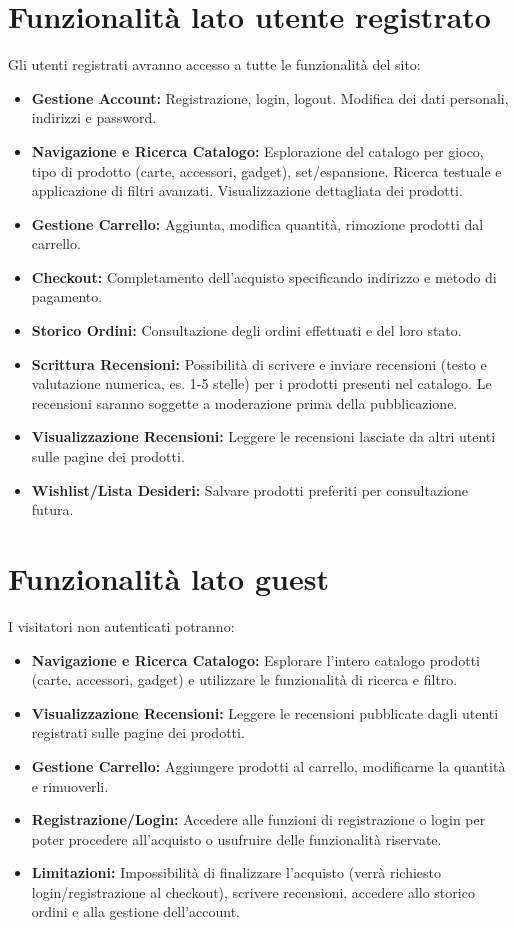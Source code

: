 \documentclass[14pt]{extreport}
\begin{document}
\section{Funzionalità lato utente registrato}
Gli utenti registrati avranno accesso a tutte le funzionalità del sito:
\begin{itemize}
    \item \textbf{Gestione Account:} Registrazione, login, logout. Modifica dei dati personali, indirizzi e password.
    \item \textbf{Navigazione e Ricerca Catalogo:} Esplorazione del catalogo per gioco, tipo di prodotto (carte, accessori, gadget), set/espansione. Ricerca testuale e applicazione di filtri avanzati. Visualizzazione dettagliata dei prodotti.
    \item \textbf{Gestione Carrello:} Aggiunta, modifica quantità, rimozione prodotti dal carrello.
    \item \textbf{Checkout:} Completamento dell'acquisto specificando indirizzo e metodo di pagamento.
    \item \textbf{Storico Ordini:} Consultazione degli ordini effettuati e del loro stato.
    \item \textbf{Scrittura Recensioni:} Possibilità di scrivere e inviare recensioni (testo e valutazione numerica, es. 1-5 stelle) per i prodotti presenti nel catalogo. Le recensioni saranno soggette a moderazione prima della pubblicazione.
    \item \textbf{Visualizzazione Recensioni:} Leggere le recensioni lasciate da altri utenti sulle pagine dei prodotti.
    \item \textbf{Wishlist/Lista Desideri:} Salvare prodotti preferiti per consultazione futura.
\end{itemize}


\section{Funzionalità lato guest}
I visitatori non autenticati potranno:
\begin{itemize}
    \item \textbf{Navigazione e Ricerca Catalogo:} Esplorare l'intero catalogo prodotti (carte, accessori, gadget) e utilizzare le funzionalità di ricerca e filtro.
    \item \textbf{Visualizzazione Recensioni:} Leggere le recensioni pubblicate dagli utenti registrati sulle pagine dei prodotti.
    \item \textbf{Gestione Carrello:} Aggiungere prodotti al carrello, modificarne la quantità e rimuoverli.
    \item \textbf{Registrazione/Login:} Accedere alle funzioni di registrazione o login per poter procedere all'acquisto o usufruire delle funzionalità riservate.
    \item \textbf{Limitazioni:} Impossibilità di finalizzare l'acquisto (verrà richiesto login/registrazione al checkout), scrivere recensioni, accedere allo storico ordini e alla gestione dell'account.
\end{itemize}
\end{document}
